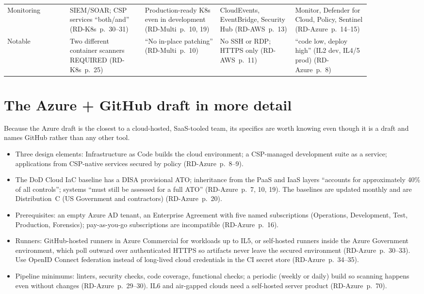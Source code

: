 \documentclass[11pt,letterpaper,twoside,openany]{memoir}
\newcommand{\pg}[2]{{\small(#1~p.~#2)}}          %
\begin{document}
{\begin{longtable}{@{}L{0.15\linewidth}L{0.18\linewidth}L{0.18\linewidth}L{0.18\linewidth}L{0.18\linewidth}@{}}
Monitoring & SIEM/SOAR; CSP services ``both/and'' \pg{RD-K8s}{30--31} & Production-ready K8s even in development \pg{RD-Multi}{10, 19} & CloudEvents, EventBridge, Security Hub \pg{RD-AWS}{13} & Monitor, Defender for Cloud, Policy, Sentinel \pg{RD-Azure}{14--15}\\
Notable & Two different container scanners REQUIRED \pg{RD-K8s}{25} & ``No in-place patching'' \pg{RD-Multi}{10} & No SSH or RDP; HTTPS only \pg{RD-AWS}{11} & ``code low, deploy high'' (IL2 dev, IL4/5 prod) \pg{RD-Azure}{8}\\
\end{longtable}}

\section{The Azure + GitHub draft in more detail}
Because the Azure draft is the closest to a cloud-hosted, SaaS-tooled team, its specifics are worth knowing even though
it is a draft and names GitHub rather than any other tool.
\begin{itemize}
\item Three design elements: Infrastructure as Code builds the cloud environment; a CSP-managed development suite as a
  service; applications from CSP-native services secured by policy \pg{RD-Azure}{8--9}.
\item The DoD Cloud IaC baseline has a DISA provisional ATO; inheritance from the PaaS and IaaS layers ``accounts for
  approximately 40\% of all controls''; systems ``must still be assessed for a full ATO'' \pg{RD-Azure}{7, 10, 19}. The
  baselines are updated monthly and are Distribution~C (US Government and contractors) \pg{RD-Azure}{20}.
\item Prerequisites: an empty Azure AD tenant, an Enterprise Agreement with five named subscriptions (Operations,
  Development, Test, Production, Forensics); pay-as-you-go subscriptions are incompatible \pg{RD-Azure}{16}.
\item Runners: GitHub-hosted runners in Azure Commercial for workloads up to IL5, or self-hosted runners inside the
  Azure Government environment, which poll outward over authenticated HTTPS so artifacts never leave the secured
  environment \pg{RD-Azure}{30--33}. Use OpenID Connect federation instead of long-lived cloud credentials in the CI
  secret store \pg{RD-Azure}{34--35}.
\item Pipeline minimums: linters, security checks, code coverage, functional checks; a periodic (weekly or daily) build
  so scanning happens even without changes \pg{RD-Azure}{29--30}. IL6 and air-gapped clouds need a self-hosted server
  product \pg{RD-Azure}{70}.
\end{itemize}
\end{document}
